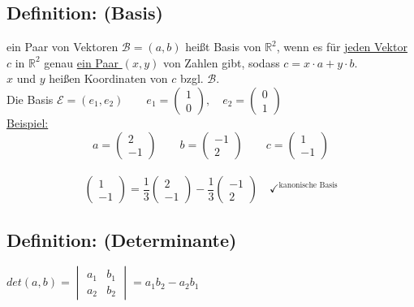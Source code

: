 \subsection{Definition: (Basis)}
ein Paar von Vektoren $\mathcal{B}=(a,b)$ heißt Basis von $\mathbb{R}^{2}$, wenn es für \underline{jeden Vektor} $c$ in $\mathbb{R}^{2}$ genau \underline{ein Paar $(x,y)$} von Zahlen gibt, sodass $c=x\cdot a + y \cdot b$. \\
$x$ und $y$ heißen Koordinaten von $c$ bzgl. $\mathcal{B}$.\\
Die Basis $\mathcal{E}=(e_{1},e_{2}) \qquad e_{1}=\begin{pmatrix} 1 \\ 0 \end{pmatrix}, \quad e_{2} = \begin{pmatrix} 0 \\ 1 \end{pmatrix}$\\
\underline{Beispiel: }\\
\begin{equation*}
a = \begin{pmatrix} 2 \\ -1 \end{pmatrix} \qquad b = \begin{pmatrix} -1 \\ 2 \end{pmatrix} \qquad c =\begin{pmatrix} 1 \\ -1 \end{pmatrix}
\end{equation*}\\
\begin{equation*}
\begin{pmatrix} 1 \\ -1\end{pmatrix} = \frac{1}{3} \begin{pmatrix} 2 \\ -1 \end{pmatrix} - \frac{1}{3} \begin{pmatrix} -1 \\ 2 \end{pmatrix} \quad \checkmark^{\textrm{kanonische Basis}}
\end{equation*}
%
%
%
%
\subsection{Definition: (Determinante)}
$det(a,b) = \begin{vmatrix} a_{1} & b_{1} \\ a_{2} & b_{2} \end{vmatrix}=a_{1}b_{2}-a_{2}b_{1}$
%
%
%
%
%
%
